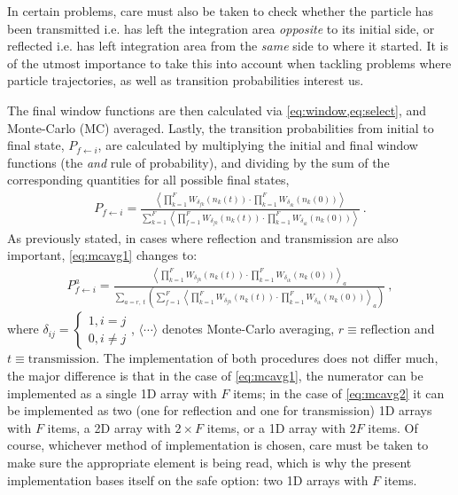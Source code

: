 In certain problems, care must also be taken to check whether the particle has been transmitted i.e. has left the integration area \emph{opposite} to its initial side, or reflected i.e. has left integration area from the \emph{same} side to where it started. It is of the utmost importance to take this into account when tackling problems where particle trajectories, as well as transition probabilities interest us.

The final window functions are then calculated via \cref{eq:window,eq:select}, and Monte-Carlo (MC) averaged. Lastly, the transition probabilities from initial to final state, $ P_{f \leftarrow i} $, are calculated by multiplying the initial and final window functions (the \emph{and} rule of probability), and dividing by the sum of the corresponding quantities for all possible final states,
\begin{align}\label{eq:mcavg1}
P_{f \leftarrow i} = \frac{\left\langle \prod\limits_{k=1}^{F} W_{\delta_{fk}}(n_{k}(t)) \cdot \prod\limits_{k=1}^{F} W_{\delta_{ik}}(n_{k}(0)) \right\rangle}{\sum\limits_{k=1}^{F} \left\langle \prod\limits_{f=1}^{F} W_{\delta_{fk}}(n_{k}(t)) \cdot \prod\limits_{k=1}^{F} W_{\delta_{ik}}(n_{k}(0)) \right\rangle}~.
\end{align}
As previously stated, in cases where reflection and transmission are also important, \cref{eq:mcavg1} changes to:
\begin{align}\label{eq:mcavg2}
P_{f \leftarrow i}^{a} = \frac{\left\langle \prod\limits_{k=1}^{F} W_{\delta_{fk}}(n_{k}(t)) \cdot \prod\limits_{k=1}^{F} W_{\delta_{ik}}(n_{k}(0)) \right\rangle_{a}}{\sum\limits_{a = r,~t} \left( \sum\limits_{f=1}^{F} \left\langle \prod\limits_{k=1}^{F} W_{\delta_{fk}}(n_{k}(t)) \cdot \prod\limits_{k=1}^{F} W_{\delta_{ik}}(n_{k}(0)) \right\rangle_{a}\right)}~,
\end{align}
where $ \delta_{ij} = \begin{cases}1, i = j\\ 0, i \neq j\end{cases} $, $ \langle \cdots \rangle $ denotes Monte-Carlo averaging, $ r \equiv \text{reflection} $ and $ t \equiv \text{transmission} $. The implementation of both procedures does not differ much, the major difference is that in the case of \cref{eq:mcavg1}, the numerator can be implemented as a single 1D array with $ F $ items; in the case of \cref{eq:mcavg2} it can be implemented as two (one for reflection and one for transmission) 1D arrays with $ F $ items, a 2D array with $ 2\times F $ items, or a 1D array with $ 2F $ items. Of course, whichever method of implementation is chosen, care must be taken to make sure the appropriate element is being read, which is why the present implementation bases itself on the safe option: two 1D arrays with $ F $ items.
%
